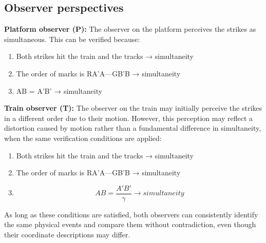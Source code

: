 \documentclass[a4paper,fleqn]{cas-sc}
\begin{document}
	\subsection{Observer perspectives}\label{subsec2_4}
		\textbf{Platform observer (P):} The observer on the platform perceives the strikes as simultaneous. This can be verified because:
			\begin{enumerate}
				\item Both strikes hit the train and the tracks → simultaneity
				\item The order of marks is RA’A—GB'B → simultaneity
				\item AB = A'B' → simultaneity
			\end{enumerate}
		\textbf{Train observer (T):} The observer on the train may initially perceive the strikes in a different order due to their motion. However, this perception may reflect a distortion caused by motion rather than a fundamental difference in simultaneity, when the same verification conditions are applied:
			\begin{enumerate}
				\item Both strikes hit the train and the tracks → simultaneity
				\item The order of marks is RA’A—GB'B → simultaneity
				\item 
    					\begin{equation*}
  						AB=\frac{A'B'}{\gamma} \to simultaneity
    					\end{equation*}
			\end{enumerate}
	As long as these conditions are satisfied, both observers can consistently identify the same physical events and compare them without contradiction, even though their coordinate descriptions may differ.
	
\end{document}
